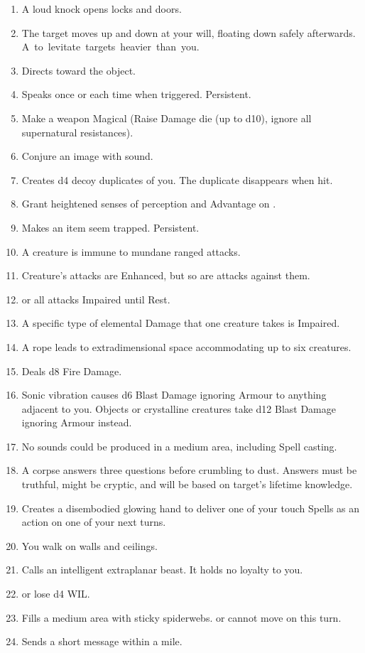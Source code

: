 \documentclass[itdr]{subfiles}
\begin{document}
\begin{enumerate}
	\item {} A loud knock opens locks and doors.
	\item {} The target moves up and down at your will, floating down safely afterwards. \mbox{A  to levitate targets heavier than you.}
	\item {} Directs toward the object.
	\item {} Speaks once or each time when triggered. Persistent.
	\item {} Make a weapon Magical (Raise Damage die (up to d10), ignore all supernatural resistances).
	\item {} Conjure an image with sound.
	\item {} Creates d4 decoy duplicates of you. The duplicate disappears when hit.
	\item {} Grant heightened senses of perception and Advantage on .
	\item {} Makes an item seem trapped. Persistent.
	\item {} A creature is immune to mundane ranged attacks.
	\item {} Creature's attacks are Enhanced, but so are attacks against them.
	\item {}  or all attacks Impaired until Rest.
	\item {} A specific type of elemental Damage that one creature takes is Impaired.
	\item {} A rope leads to extradimensional space accommodating up to six creatures.
	\item {} Deals d8 Fire Damage.
	\item {} Sonic vibration causes d6 Blast Damage ignoring Armour to anything adjacent to you. Objects or crystalline creatures take d12 Blast Damage ignoring Armour instead.
	\item {} No sounds could be produced in a medium area, including Spell casting.
	\item {} A corpse answers three questions before crumbling to dust. Answers must be truthful, might be cryptic, and will be based on target's lifetime knowledge.
	\item {} Creates a disembodied glowing hand to deliver one of your touch Spells as an action on one of your next turns.
	\item {} You walk on walls and ceilings.
	\item {} Calls an intelligent extraplanar beast. It holds no loyalty to you.
	\item {}  or lose d4 WIL.
	\item {} Fills a medium area with sticky spiderwebs.  or cannot move on this turn.
	\item {} Sends a short message within a mile.
\end{enumerate}
\end{document}
